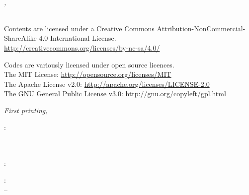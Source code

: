 

\thispagestyle{empty}

\hfill

\vfill

\noindent\myName\\
\textit{\myTitle,}\\
\textcopyright\ \myTime

\bigskip

\noindent Contents are licensed under a Creative Commons Attribution-NonCommercial-ShareAlike 4.0 International License.\\
\url{http://creativecommons.org/licenses/by-nc-sa/4.0/}

\medskip

\noindent Codes are variously licensed under open source licences.\\
The MIT License: \url{http://opensource.org/licenses/MIT}\\
The Apache License v2.0: \url{http://apache.org/licenses/LICENSE-2.0}\\
The GNU General Public License v3.0: \url{http://gnu.org/copyleft/gpl.html}\\

\bigskip

\noindent \textit{First printing, \myDatePrint}

\bigskip

\noindent{}: \\
\mySupervisor \\
\myExaminerA \\
\myExaminerB

\medskip

\noindent{}: \\
\myLocation

\medskip

\noindent{}: \\
\myMonthFirst \xspace \myYearFirst \xspace -- \myMonthLast \xspace \myYearLast
